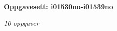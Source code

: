 \centerline{\bf Oppgavesett: i01530no-i01539no}
\vskip 10pt
\centerline{\it 10 oppgaver}\vskip 10pt
\vskip 10pt
